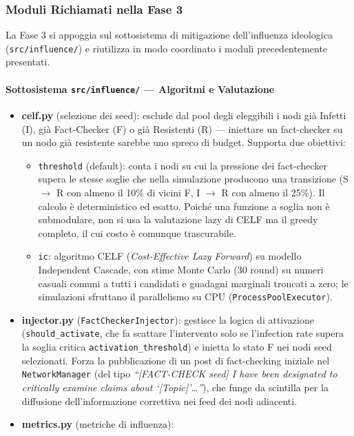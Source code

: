 \documentclass[11pt, a4paper]{article}
\begin{document}
\subsubsection{Moduli Richiamati nella Fase 3}
La Fase 3 si appoggia sul sottosistema di mitigazione dell'influenza ideologica (\texttt{src/influence/}) e riutilizza in modo coordinato i moduli precedentemente presentati.

\paragraph{Sottosistema \texttt{src/influence/} — Algoritmi e Valutazione}
\begin{itemize}[leftmargin=*]
    \item \textbf{celf.py} (selezione dei seed): esclude dal pool degli eleggibili i nodi già Infetti (I), già Fact-Checker (F) o già Resistenti (R) — iniettare un fact-checker su un nodo già resistente sarebbe uno spreco di budget. Supporta due obiettivi:
    \begin{itemize}
        \item \texttt{threshold} (default): conta i nodi su cui la pressione dei fact-checker supera le stesse soglie che nella simulazione producono una transizione (S $\to$ R con almeno il 10\% di vicini F, I $\to$ R con almeno il 25\%). Il calcolo è deterministico ed esatto. Poiché una funzione a soglia non è submodulare, non si usa la valutazione lazy di CELF ma il greedy completo, il cui costo è comunque trascurabile.
        \item \texttt{ic}: algoritmo CELF (\textit{Cost-Effective Lazy Forward}) su modello Independent Cascade, con stime Monte Carlo (30 round) su numeri casuali comuni a tutti i candidati e guadagni marginali troncati a zero; le simulazioni sfruttano il parallelismo su CPU (\texttt{ProcessPoolExecutor}).
    \end{itemize}
    \item \textbf{injector.py} (\texttt{FactCheckerInjector}): gestisce la logica di attivazione (\texttt{should\_activate}, che fa scattare l'intervento solo se l'infection rate supera la soglia critica \texttt{activation\_threshold}) e inietta lo stato F nei nodi seed selezionati. Forza la pubblicazione di un post di fact-checking iniziale nel \texttt{NetworkManager} (del tipo \textit{``[FACT-CHECK seed] I have been designated to critically examine claims about `[Topic]'\ldots''}), che funge da scintilla per la diffusione dell'informazione correttiva nei feed dei nodi adiacenti.
    \item \textbf{metrics.py} (metriche di influenza):

\end{itemize}
\end{document}

